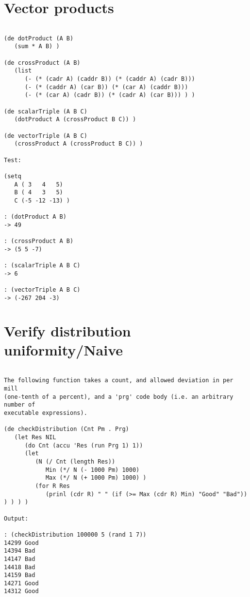 \section*{Vector products}

\begin{verbatim}

(de dotProduct (A B)
   (sum * A B) )

(de crossProduct (A B)
   (list
      (- (* (cadr A) (caddr B)) (* (caddr A) (cadr B)))
      (- (* (caddr A) (car B)) (* (car A) (caddr B)))
      (- (* (car A) (cadr B)) (* (cadr A) (car B))) ) )

(de scalarTriple (A B C)
   (dotProduct A (crossProduct B C)) )

(de vectorTriple (A B C)
   (crossProduct A (crossProduct B C)) )

Test:

(setq
   A ( 3   4   5)
   B ( 4   3   5)
   C (-5 -12 -13) )

: (dotProduct A B)
-> 49

: (crossProduct A B)
-> (5 5 -7)

: (scalarTriple A B C)
-> 6

: (vectorTriple A B C)
-> (-267 204 -3)

\end{verbatim}

\section*{Verify distribution uniformity/Naive}

\begin{verbatim}

The following function takes a count, and allowed deviation in per mill
(one-tenth of a percent), and a 'prg' code body (i.e. an arbitrary number of
executable expressions).

(de checkDistribution (Cnt Pm . Prg)
   (let Res NIL
      (do Cnt (accu 'Res (run Prg 1) 1))
      (let
         (N (/ Cnt (length Res))
            Min (*/ N (- 1000 Pm) 1000)
            Max (*/ N (+ 1000 Pm) 1000) )
         (for R Res
            (prinl (cdr R) " " (if (>= Max (cdr R) Min) "Good" "Bad")) ) ) ) )

Output:

: (checkDistribution 100000 5 (rand 1 7))
14299 Good
14394 Bad
14147 Bad
14418 Bad
14159 Bad
14271 Good
14312 Good

\end{verbatim}

